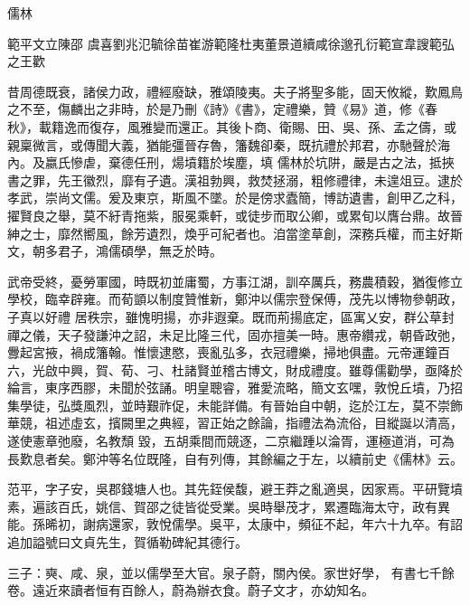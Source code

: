 
\begin{pinyinscope}

 儒林



 範平文立陳邵
 虞喜劉兆氾毓徐苗崔游範隆杜夷董景道續咸徐邈孔衍範宣韋謏範弘之王歡



 昔周德既衰，諸侯力政，禮經廢缺，雅頌陵夷。夫子將聖多能，固天攸縱，歎鳳鳥之不至，傷麟出之非時，於是乃刪《詩》《書》，定禮樂，贊《易》道，修《春秋》，載籍逸而復存，風雅變而還正。其後卜商、衛賜、田、吳、孫、孟之儔，或親稟微言，或傳聞大義，猶能彊晉存魯，籓魏卻秦，既抗禮於邦君，亦馳聲於海內。及嬴氏慘虐，棄德任刑，煬墳籍於埃塵，填
 儒林於坑阱，嚴是古之法，抵挾書之罪，先王徽烈，靡有孑遺。漢祖勃興，救焚拯溺，粗修禮律，未遑俎豆。逮於孝武，崇尚文儒。爰及東京，斯風不墜。於是傍求蠹簡，博訪遺書，創甲乙之科，擢賢良之舉，莫不紆青拖紫，服冕乘軒，或徒步而取公卿，或累旬以膺台鼎。故晉紳之士，靡然嚮風，餘芳遺烈，煥乎可紀者也。洎當塗草創，深務兵權，而主好斯文，朝多君子，鴻儒碩學，無乏於時。



 武帝受終，憂勞軍國，時既初並庸蜀，方事江湖，訓卒厲兵，務農積穀，猶復修立學校，臨幸辟雍。而荀顗以制度贊惟新，鄭沖以儒宗登保傅，茂先以博物參朝政，子真以好禮
 居秩宗，雖愧明揚，亦非遐棄。既而荊揚底定，區寓乂安，群公草封禪之儀，天子發謙沖之詔，未足比隆三代，固亦擅美一時。惠帝纘戎，朝昏政弛，釁起宮掖，禍成籓翰。惟懷逮愍，喪亂弘多，衣冠禮樂，掃地俱盡。元帝運鐘百六，光啟中興，賀、荀、刁、杜諸賢並稽古博文，財成禮度。雖尊儒勸學，亟降於綸言，東序西膠，未聞於弦誦。明皇聰睿，雅愛流略，簡文玄嘿，敦悅丘墳，乃招集學徒，弘獎風烈，並時艱祚促，未能詳備。有晉始自中朝，迄於江左，莫不崇飾華競，祖述虛玄，擯闕里之典經，習正始之餘論，指禮法為流俗，目縱誕以清高，遂使憲章弛廢，名教頹
 毀，五胡乘間而競逐，二京繼踵以淪胥，運極道消，可為長歎息者矣。鄭沖等名位既隆，自有列傳，其餘編之于左，以續前史《儒林》云。



 范平，字子安，吳郡錢塘人也。其先銍侯馥，避王莽之亂適吳，因家焉。平研覽墳素，遍該百氏，姚信、賀邵之徒皆從受業。吳時舉茂才，累遷臨海太守，政有異能。孫晞初，謝病還家，敦悅儒學。吳平，太康中，頻征不起，年六十九卒。有詔追加謚號曰文貞先生，賀循勒碑紀其德行。



 三子：奭、咸、泉，並以儒學至大官。泉子蔚，關內侯。家世好學，
 有書七千餘卷。遠近來讀者恒有百餘人，蔚為辦衣食。蔚子文才，亦幼知名。




\end{pinyinscope}
